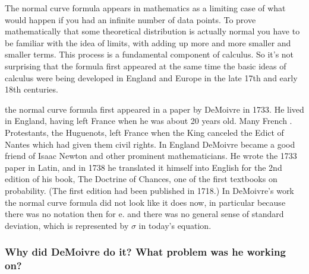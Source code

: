 \documentclass{article}
\begin{document}
The normal curve formula appears in mathematics as a limiting case of what would happen if you had an
infinite number of data points. To prove mathematically that some theoretical distribution is actually
normal you have to be familiar with the idea of limits, with adding up more and more smaller and smaller
terms. This process is a fundamental component of calculus. So it’s not surprising that the formula first
appeared at the same time the basic ideas of calculus were being developed in England and Europe in the
late 17th and early 18th centuries.

the normal curve formula first appeared in a paper by DeMoivre in 1733. He lived in
England, having left France when he was about 20 years old. Many French .
Protestants, the Huguenots, left France when the King canceled the Edict of Nantes
which had given them civil rights. In England DeMoivre became a good friend of
Isaac Newton and other prominent mathematicians.
He wrote the 1733 paper in Latin, and in 1738 he translated it himself into English for
the 2nd edition of his book, The Doctrine of Chances, one of the first textbooks on
probability. (The first edition had been published in 1718.)
In DeMoivre’s work the normal curve formula did not look like it does now, in particular because there
was no notation then for e. and there was no general sense of standard deviation, which is represented by $ \sigma $ in today’s equation.

\subsubsection{Why did DeMoivre do it? What problem was he working on?}
\end{document}
